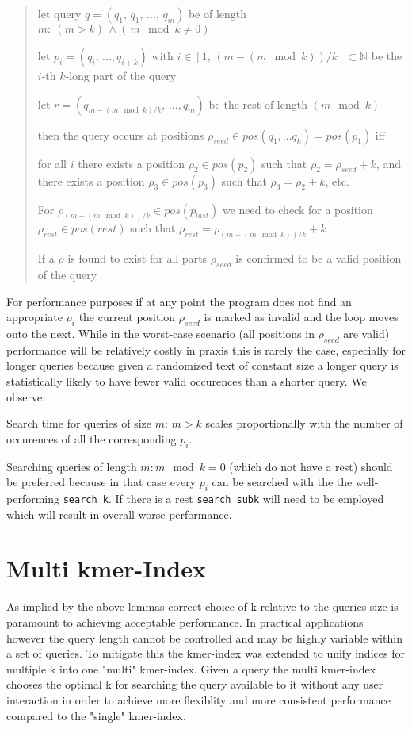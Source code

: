 \begin{verse}
let query $q=(q_{1},\,q_{1},\,...,\,q_{m})$ be of length $m:\:(m>k)\,\land(\,m\mod k\neq\text{0})$

let $p_{i}=(q_{i},\,...,q_{i+k})$ with $i\in[1,\,(m-(m\mod k))/k]\subset\mathbb{N}$
be the $i$-th $k$-long part of the query

let $r=(q_{m-(m\mod k)/k},\,...,q_{m})$ be the rest of length $(m\mod k)$

then the query occurs at positions $\rho_{seed}\in pos(q_{1},...q_{k})=pos(p_{1})$
iff

for all $i$ there exists a position $\rho_{2}\in pos(p_{2})$ such
that $\rho_{2}=\rho_{seed}+k$, and there exists a position $\rho_{3}\in pos(p_{3})$
such that $\rho_{3}=\rho_{2}+k$, etc.

For $\rho_{(m-(m\mod k))/k}\in pos(p_{last})$ we need to check for
a position $\rho_{rest}\in pos(rest)$ such that $\rho_{rest}=\rho_{(m-(m\mod k))/k}+k$

If a $\rho$ is found to exist for all parts $\rho_{seed}$ is confirmed to be a valid position of the query
\end{verse}

For performance purposes if at any point the program does not find an appropriate $\rho_{i}$ the current position
$\rho_{seed}$ is marked as invalid and the loop moves onto the next. While in the worst-case scenario (all positions
in $\rho_{seed}$ are valid) performance will be relatively costly in praxis this is rarely the case, especially for
longer queries because given a randomized text of constant size a longer query is statistically likely to have fewer valid
occurences than a shorter query. We observe:

\begin{lem}
\label{Lemma 3}Search time for queries of size $m:\,m>k$ scales
proportionally with the number of occurences of all the corresponding $p_{i}$.
\end{lem}

Searching queries of length $m:m\mod k=0$ (which do not have a rest)
should be preferred because in that case every $p_{i}$ can be searched with the the well-performing \lstinline{search_k}.
If there is a rest \lstinline{search_subk} will need to be employed which will result in overall worse performance.

\section{Multi kmer-Index}

As implied by the above lemmas correct choice of k relative to the queries size is paramount to achieving acceptable
performance. In practical applications however the query length cannot be controlled and may be highly variable within
a set of queries. To mitigate this the kmer-index was extended to unify indices for multiple k
into one "multi" kmer-index. Given a query the multi kmer-index chooses the optimal k for searching the query available
to it without any user interaction in order to achieve more flexiblity and more consistent
performance compared to the "single" kmer-index.